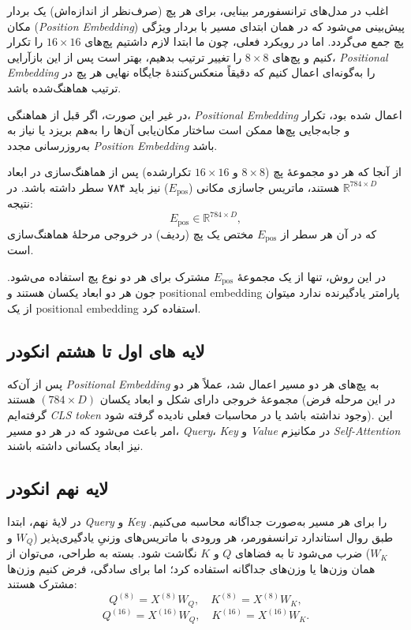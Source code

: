 اغلب در مدل‌های ترانسفورمر بینایی، برای هر پچ (صرف‌نظر از اندازه‌اش) یک بردار مکان (\textit{Position Embedding}) پیش‌بینی می‌شود که در همان ابتدای مسیر با بردار ویژگی پچ جمع می‌گردد. اما در رویکرد فعلی، چون ما ابتدا لازم داشتیم پچ‌های $16 \times 16$ را تکرار کنیم و پچ‌های $8 \times 8$ را تغییر ترتیب بدهیم، بهتر است پس از این بازآرایی، \textit{Positional Embedding} را به‌گونه‌ای اعمال کنیم که دقیقاً منعکس‌کنندهٔ جایگاه نهایی هر پچ در ترتیب هماهنگ‌شده باشد. 

در غیر این صورت، اگر قبل از هماهنگی، \textit{Positional Embedding} اعمال شده بود، تکرار و جابه‌جایی پچ‌ها ممکن است ساختار مکان‌یابی آن‌ها را به‌هم بریزد یا نیاز به به‌روزرسانی مجدد \textit{Position Embedding} باشد.

از آنجا که هر دو مجموعهٔ پچ ($8 \times 8$ و $16 \times 16$ تکرارشده) پس از هماهنگ‌سازی در ابعاد 
\(\mathbb{R}^{784 \times D}\)
هستند، ماتریس جاسازی مکانی (\(E_{\text{pos}}\)) نیز باید ۷۸۴ سطر داشته باشد. در نتیجه:
\[
E_{\text{pos}} \in \mathbb{R}^{784 \times D},
\]
که در آن هر سطر از \(E_{\text{pos}}\) مختص یک پچ (ردیف) در خروجی مرحلهٔ هماهنگ‌سازی است.

در این روش، تنها از یک مجموعهٔ \(E_{\text{pos}}\) مشترک برای هر دو نوع پچ استفاده می‌شود. جون هر دو ابعاد یکسان هستند و positional embedding  پارامتر یادگیرنده ندارد میتوان از یک positional embedding  استفاده کرد.

\subsection{لایه های اول تا هشتم انکودر}

پس از آن‌که \textit{Positional Embedding} به پچ‌های هر دو مسیر اعمال شد، عملاً هر دو مجموعهٔ خروجی دارای شکل و ابعاد یکسان \((784 \times D)\) هستند (در این مرحله فرض گرفته‌ایم \textit{CLS token} وجود نداشته باشد یا در محاسبات فعلی نادیده گرفته شود). این امر باعث می‌شود که در هر دو مسیر، \textit{Query}، \textit{Key} و \textit{Value} در مکانیزم \textit{Self-Attention} نیز ابعاد یکسانی داشته باشند.

\subsection{لایه نهم انکودر}

در لایهٔ نهم، ابتدا \textit{Query} و \textit{Key} را برای هر مسیر به‌صورت جداگانه محاسبه می‌کنیم. طبق روال استاندارد ترانسفورمر، هر ورودی با ماتریس‌های وزنیِ یادگیری‌پذیر (\(W_Q\) و \(W_K\)) ضرب می‌شود تا به فضاهای \(Q\) و \(K\) نگاشت شود. بسته به طراحی، می‌توان از همان وزن‌ها یا وزن‌های جداگانه استفاده کرد؛ اما برای سادگی، فرض کنیم وزن‌ها مشترک هستند:
\[
Q^{(8)} = X^{(8)} W_Q, \quad K^{(8)} = X^{(8)} W_K,
\]
\[
Q^{(16)} = X^{(16)} W_Q, \quad K^{(16)} = X^{(16)} W_K.
\]

